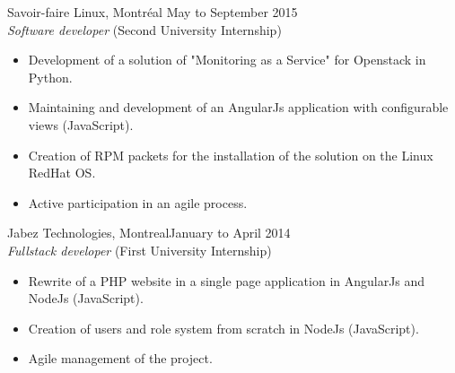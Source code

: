 \documentclass{res}
\newcommand{\inFrench}[1]{}
\newcommand{\inEnglish}[1]{#1}
\begin{document}
\begin{resume}
{	%
	Savoir-faire Linux, Montréal
	\hfill May to September 2015 \\
	{\sl Software developer} \hfill (Second University Internship)
	\vspace{0.05in}

	\begin{itemize} \itemsep -2pt
		\item Development of a solution of "Monitoring as a Service" for Openstack in Python.
		\item Maintaining and development of an AngularJs application with configurable views (JavaScript).
		\item Creation of RPM packets for the installation of the solution on the Linux RedHat OS.
		\item Active participation in an agile process.
	\end{itemize}

	Jabez Technologies, Montreal\footnotemark[\value{footnote}]
	\hfill January to April 2014 \\
	{\sl Fullstack developer} \hfill (First University Internship)
	\vspace{0.05in}

	\begin{itemize} \itemsep -2pt
		\item Rewrite of a PHP website in a single page application in AngularJs and NodeJs (JavaScript).
		\item Creation of users and role system from scratch in NodeJs (JavaScript).
		\item Agile management of the project.
	\end{itemize}



}

\inFrench{
	\section{Connaissances informatiques}
}
\inEnglish{
}
\end{resume}
\end{document}

